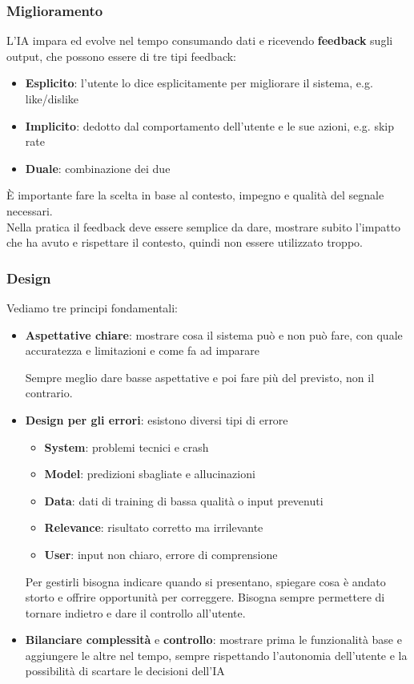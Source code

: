 \subsubsection{Miglioramento}
L'IA impara ed evolve nel tempo consumando dati e ricevendo \textbf{feedback} sugli output, che possono essere di tre tipi feedback:
\begin{itemize}
	\item \textbf{Esplicito}: l'utente lo dice esplicitamente per migliorare il sistema, e.g. like/dislike
	\item \textbf{Implicito}: dedotto dal comportamento dell'utente e le sue azioni, e.g. skip rate
	\item \textbf{Duale}: combinazione dei due
\end{itemize}
È importante fare la scelta in base al contesto, impegno e qualità del segnale necessari.\\

Nella pratica il feedback deve essere semplice da dare, mostrare subito l'impatto che ha avuto e rispettare il contesto, quindi non essere utilizzato troppo.

\subsubsection{Design}
Vediamo tre principi fondamentali:
\begin{itemize}
	\item \textbf{Aspettative chiare}: mostrare cosa il sistema può e non può fare, con quale accuratezza e limitazioni e come fa ad imparare
	\begin{note}
		Sempre meglio dare basse aspettative e poi fare più del previsto, non il contrario.
	\end{note}
	\item \textbf{Design per gli errori}: esistono diversi tipi di errore
	\begin{itemize}
		\item \textbf{System}: problemi tecnici e crash
		\item \textbf{Model}: predizioni sbagliate e allucinazioni
		\item \textbf{Data}: dati di training di bassa qualità o input prevenuti
		\item \textbf{Relevance}: risultato corretto ma irrilevante
		\item \textbf{User}: input non chiaro, errore di comprensione
	\end{itemize}
	Per gestirli bisogna indicare quando si presentano, spiegare cosa è andato storto e offrire opportunità per correggere. Bisogna sempre permettere di tornare indietro e  dare il controllo all'utente.
	\item \textbf{Bilanciare complessità} e \textbf{controllo}: mostrare prima le funzionalità base e aggiungere le altre nel tempo, sempre rispettando l'autonomia dell'utente e la possibilità di scartare le decisioni dell'IA
\end{itemize}

